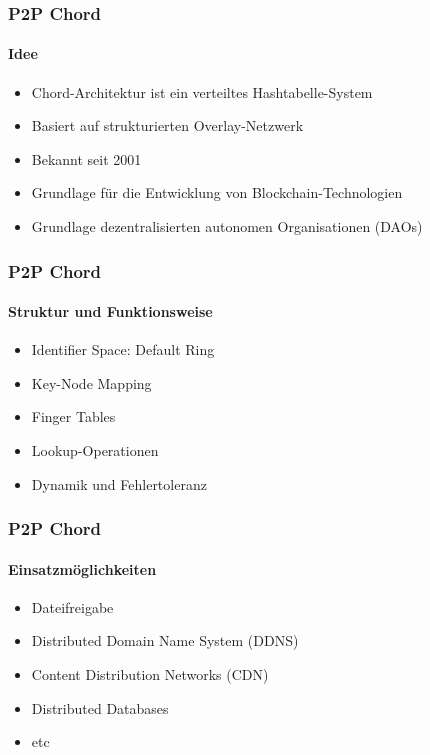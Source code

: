 
\begin{frame}
  \frametitle{P2P Chord}
  \framesubtitle{Idee}
  \begin{itemize}
    \item Chord-Architektur ist ein verteiltes Hashtabelle-System
    \item Basiert auf strukturierten Overlay-Netzwerk
    \item Bekannt seit 2001
    \item Grundlage für die Entwicklung von Blockchain-Technologien 
    \item Grundlage dezentralisierten autonomen Organisationen (DAOs) 
  \end{itemize}
\end{frame}

\begin{frame}
  \frametitle{P2P Chord}
  \framesubtitle{Struktur und Funktionsweise}
  \begin{itemize}
    \item Identifier Space: Default Ring
    \item Key-Node Mapping
    \item Finger Tables
    \item Lookup-Operationen
    \item Dynamik und Fehlertoleranz
  \end{itemize}
\end{frame}

\begin{frame}
  \frametitle{P2P Chord}
  \framesubtitle{Einsatzmöglichkeiten}
  \begin{itemize}
    \item Dateifreigabe
    \item Distributed Domain Name System (DDNS)
    \item Content Distribution Networks (CDN)
    \item Distributed Databases
    \item etc
  \end{itemize}
\end{frame}

